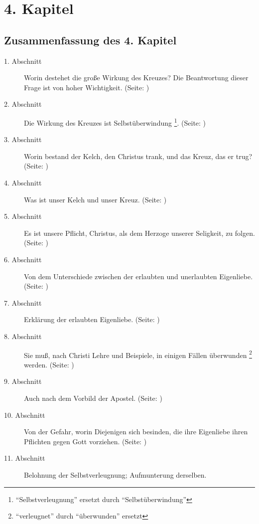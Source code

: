 

\chapter{4. Kapitel} \label{kap4}

\section{Zusammenfassung des 4. Kapitel}
\footnotesize
\begin{description}
\item[1. Abschnitt] Worin destehet die große Wirkung des Kreuzes? Die
Beantwortung dieser Frage ist von hoher Wichtigkeit.
(Seite: \pageref{kap4_ab1})
\item[2. Abschnitt] Die Wirkung des Kreuzes ist Selbstüberwindung
\footnote{"`Selbstverleugnung"' ersetzt durch "`Selbstüberwindung"'}.
(Seite: \pageref{kap4_ab2})
\item[3. Abschnitt] Worin bestand der Kelch, den Christus trank, und das Kreuz,
das er trug? (Seite: \pageref{kap4_ab3})
\item[4. Abschnitt]  Was ist unser Kelch und unser Kreuz. (Seite:
\pageref{kap4_ab4})
\item[5. Abschnitt] Es ist unsere Pflicht, Christus, als dem Herzoge unserer
Seligkeit, zu folgen. (Seite: \pageref{kap4_ab5})
\item[6. Abschnitt] Von dem Unterschiede zwischen der erlaubten und unerlaubten
Eigenliebe. (Seite: \pageref{kap4_ab6})
\item[7. Abschnitt] Erklärung der erlaubten Eigenliebe. (Seite:
\pageref{kap4_ab7})
\item[8. Abschnitt] Sie muß, nach Christi Lehre und Beispiele, in einigen Fällen
überwunden \footnote{"`verleugnet"' durch "`überwunden"' ersetzt} werden.
(Seite: \pageref{kap4_ab8})
\item[9. Abschnitt] Auch nach dem Vorbild der Apostel. (Seite:
\pageref{kap4_ab9})
\item[10. Abschnitt] Von der Gefahr, worin Diejenigen sich besinden, die ihre
Eigenliebe ihren Pflichten gegen Gott vorziehen. (Seite: \pageref{kap4_ab10})
\item[11. Abschnitt] Belohnung der Selbstverleugnung; Aufmunterung derselben.

\end{description}
